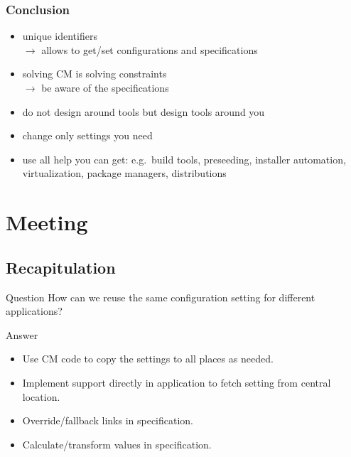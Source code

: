 \begin{frame}
	\frametitle{Conclusion}

	\begin{itemize}[<+-| alert@+>]
	\item unique identifiers \\ $\rightarrow$ allows to get/set configurations and specifications
	\item solving CM is solving constraints \\ $\rightarrow$ be aware of the specifications
	\item do not design around tools but design tools around you
	\item change only settings you need
	\item use all help you can get: e.g.\ build tools, preseeding, installer automation, virtualization, package managers, distributions
	\end{itemize}
\end{frame}



\section{Meeting}

\subsection{Recapitulation}


\begin{frame}
	\begin{alertblock}{Question}
	How can we reuse the same configuration setting for different applications?
	\end{alertblock}

	\pause
	\begin{exampleblock}{Answer}
	\begin{itemize}
	\item Use CM code to copy the settings to all places as needed.
	\item Implement support directly in application to fetch setting from central location.
	\item Override/fallback links in specification.
	\item Calculate/transform values in specification.
	\end{itemize}
	\end{exampleblock}
\end{frame}

